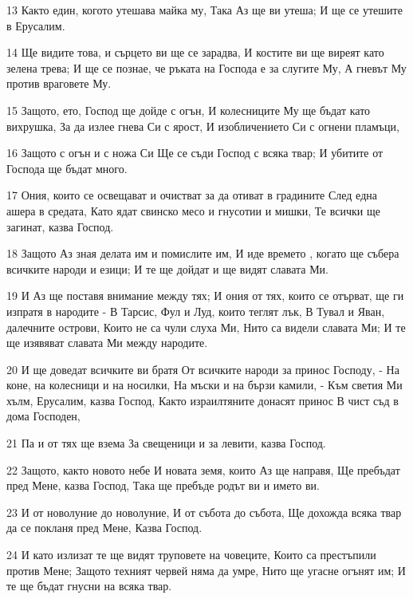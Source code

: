 \par 13 Както един, когото утешава майка му, Така Аз ще ви утеша; И ще се утешите в Ерусалим.
\par 14 Ще видите това, и сърцето ви ще се зарадва, И костите ви ще виреят като зелена трева; И ще се познае, че ръката на Господа е за слугите Му, А гневът Му против враговете Му.
\par 15 Защото, ето, Господ ще дойде с огън, И колесниците Му ще бъдат като вихрушка, За да излее гнева Си с ярост, И изобличението Си с огнени пламъци,
\par 16 Защото с огън и с ножа Си Ще се съди Господ с всяка твар; И убитите от Господа ще бъдат много.
\par 17 Ония, които се освещават и очистват за да отиват в градините След една ашера в средата, Като ядат свинско месо и гнусотии и мишки, Те всички ще загинат, казва Господ.
\par 18 Защото Аз зная делата им и помислите им, И иде времето , когато ще събера всичките народи и езици; И те ще дойдат и ще видят славата Ми.
\par 19 И Аз ще поставя внимание между тях; И ония от тях, които се отърват, ще ги изпратя в народите - В Тарсис, Фул и Луд, които теглят лък, В Тувал и Яван, далечните острови, Които не са чули слуха Ми, Нито са видели славата Ми; И те ще изявяват славата Ми между народите.
\par 20 И ще доведат всичките ви братя От всичките народи за принос Господу, - На коне, на колесници и на носилки, На мъски и на бързи камили, - Към светия Ми хълм, Ерусалим, казва Господ, Както израилтяните донасят принос В чист съд в дома Господен,
\par 21 Па и от тях ще взема За свещеници и за левити, казва Господ.
\par 22 Защото, както новото небе И новата земя, които Аз ще направя, Ще пребъдат пред Мене, казва Господ, Така ще пребъде родът ви и името ви.
\par 23 И от новолуние до новолуние, И от събота до събота, Ще дохожда всяка твар да се покланя пред Мене, Казва Господ.
\par 24 И като излизат те ще видят труповете на човеците, Които са престъпили против Мене; Защото техният червей няма да умре, Нито ще угасне огънят им; И те ще бъдат гнусни на всяка твар.

